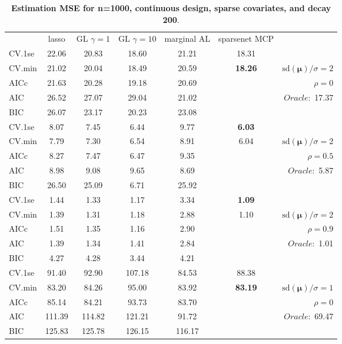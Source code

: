 \begin{table}\vspace{-.5cm}
\caption[l]{ { \bf Estimation MSE for n=1000, continuous design, 
sparse covariates, and  decay  200}.}
\vspace{-.5cm}
\footnotesize{}
\begin{center}
\begin{tabular}{l*{5}{c}|r}
& lasso & GL $\gamma=1$ & GL $\gamma=10$ & marginal AL & sparsenet MCP  & \\
 \cline{1-7}
CV.1se & 22.06 & 20.83 & 18.60 & 21.21 & 18.31 & \\
CV.min & 21.02 & 20.04 & 18.49 & 20.59 & {\bf 18.26} &  $\mathrm{sd}(\mathbf{\mu})/\sigma=2$ \\
AICc & 21.63 & 20.28 & 19.18 & 20.69 & & $\rho=0$ \\
AIC & 26.52 & 27.07 & 29.04 & 21.02 & &  \multirow{2}{*}{$Oracle: $ 17.37} \\
BIC & 26.07 & 23.17 & 20.23 & 23.08 & &  \\
 \hline 
CV.1se & 8.07 & 7.45 & 6.44 & 9.77 & {\bf 6.03} & \\
CV.min & 7.79 & 7.30 & 6.54 & 8.91 & 6.04 &  $\mathrm{sd}(\mathbf{\mu})/\sigma=2$ \\
AICc & 8.27 & 7.47 & 6.47 & 9.35 & & $\rho=0.5$ \\
AIC & 8.98 & 9.08 & 9.65 & 8.69 & &  \multirow{2}{*}{$Oracle: $ 5.87} \\
BIC & 26.50 & 25.09 & 6.71 & 25.92 & &  \\
 \hline 
CV.1se & 1.44 & 1.33 & 1.17 & 3.34 & {\bf 1.09} & \\
CV.min & 1.39 & 1.31 & 1.18 & 2.88 & 1.10 &  $\mathrm{sd}(\mathbf{\mu})/\sigma=2$ \\
AICc & 1.51 & 1.35 & 1.16 & 2.90 & & $\rho=0.9$ \\
AIC & 1.39 & 1.34 & 1.41 & 2.84 & &  \multirow{2}{*}{$Oracle: $ 1.01} \\
BIC & 4.27 & 4.28 & 3.44 & 4.21 & &  \\
 \hline 
CV.1se & 91.40 & 92.90 & 107.18 & 84.53 & 88.38 & \\
CV.min & 83.20 & 84.26 & 95.00 & 83.92 & {\bf 83.19} &  $\mathrm{sd}(\mathbf{\mu})/\sigma=1$ \\
AICc & 85.14 & 84.21 & 93.73 & 83.70 & & $\rho=0$ \\
AIC & 111.39 & 114.82 & 121.21 & 91.72 & &  \multirow{2}{*}{$Oracle: $ 69.47} \\
BIC & 125.83 & 125.78 & 126.15 & 116.17 & &  \\

\end{tabular}
\end{center}
\end{table}
